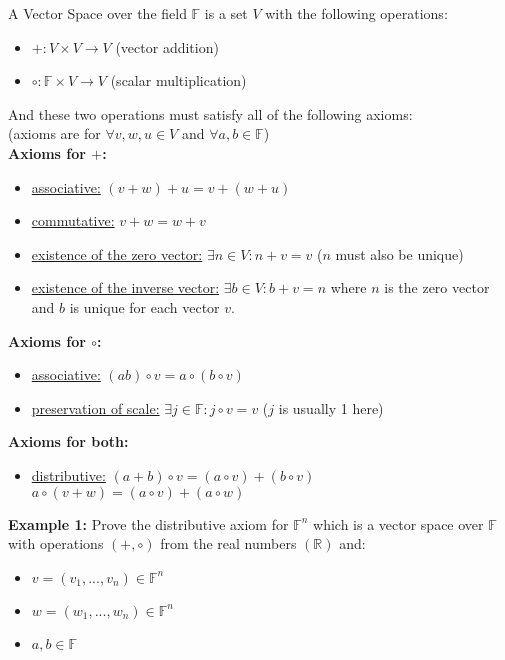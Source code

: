 \documentclass[12pt]{article}
\begin{document}
\begin{tcolorbox}[title=Vector Spaces]
A Vector Space over the field $\mathbb{F}$ is a set $V$ with the following operations:
\begin{itemize}
	\item{$+:V \times V \longrightarrow V$ (vector addition)}
	\item{$\circ:\mathbb{F} \times V \longrightarrow V$ (scalar multiplication)}
\end{itemize}
And these two operations must satisfy all of the following axioms:\\
(axioms are for $\forall v,w,u \in V$ and $\forall a,b \in\mathbb{F}$)\\
\textbf{Axioms for $+$:}
\begin{itemize}
	\item{\underline{associative:} $(v + w) + u = v + (w + u)$}
	\item{\underline{commutative:} $v + w = w + v$}
	\item{\underline{existence of the zero vector:} $\exists n \in V : n + v = v$ ($n$ must also be unique)}
	\item{\underline{existence of the inverse vector:} $\exists b \in V : b + v = n$ where $n$ is the zero vector and $b$ is unique for each vector $v$.}
\end{itemize}
\textbf{Axioms for $\circ$:}
\begin{itemize}
	\item{\underline{associative:} $(ab) \circ v = a \circ (b \circ v)$}
	\item{\underline{preservation of scale:} $\exists j \in\mathbb{F} : j \circ v = v$ ($j $ is usually 1 here)}
\end{itemize}
\textbf{Axioms for both:}
\begin{itemize}
	\item{\underline{distributive:} $(a + b) \circ v = (a \circ v) + (b \circ v)$\\
	$a \circ (v + w) = (a \circ v) + (a \circ w)$}
\end{itemize}
\end{tcolorbox}

\textbf{Example 1:} Prove the distributive axiom for $\mathbb{F}^n$ which is a vector space over $\mathbb{F}$ with operations $(+, \circ)$ from the real numbers $(\mathbb{R})$ and:
\begin{itemize}
	\item{$v = (v_1, ... ,  v_n) \in\mathbb{F}^n$}
	\item{$w = (w_1, ... ,  w_n) \in\mathbb{F}^n$}
	\item{$a,b \in\mathbb{F}$}
\end{itemize}
\end{document}
